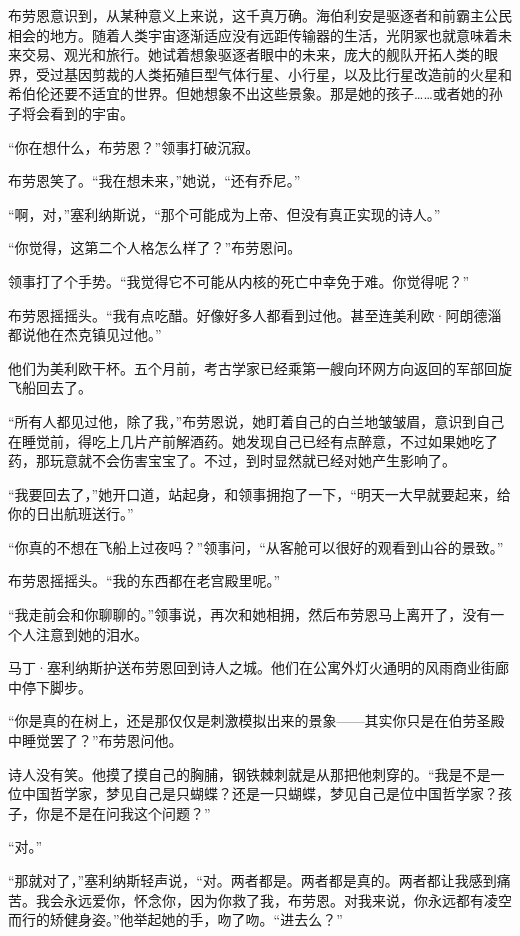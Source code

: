 \documentclass[AutoFakeBold=true]{book}
\begin{document}
布劳恩意识到，从某种意义上来说，这千真万确。海伯利安是驱逐者和前霸主公民相会的地方。随着人类宇宙逐渐适应没有远距传输器的生活，光阴冢也就意味着未来交易、观光和旅行。她试着想象驱逐者眼中的未来，庞大的舰队开拓人类的眼界，受过基因剪裁的人类拓殖巨型气体行星、小行星，以及比行星改造前的火星和希伯伦还要不适宜的世界。但她想象不出这些景象。那是她的孩子……或者她的孙子将会看到的宇宙。

``你在想什么，布劳恩？''领事打破沉寂。

布劳恩笑了。``我在想未来，''她说，``还有乔尼。''

``啊，对，''塞利纳斯说，``那个可能成为上帝、但没有真正实现的诗人。''

``你觉得，这第二个人格怎么样了？''布劳恩问。

领事打了个手势。``我觉得它不可能从内核的死亡中幸免于难。你觉得呢？''

布劳恩摇摇头。``我有点吃醋。好像好多人都看到过他。甚至连美利欧·阿朗德淄都说他在杰克镇见过他。''

他们为美利欧干杯。五个月前，考古学家已经乘第一艘向环网方向返回的军部回旋飞船回去了。

``所有人都见过他，除了我，''布劳恩说，她盯着自己的白兰地皱皱眉，意识到自己在睡觉前，得吃上几片产前解酒药。她发现自己已经有点醉意，不过如果她吃了药，那玩意就不会伤害宝宝了。不过，到时显然就已经对她产生影响了。

``我要回去了，''她开口道，站起身，和领事拥抱了一下，``明天一大早就要起来，给你的日出航班送行。''

``你真的不想在飞船上过夜吗？''领事问，``从客舱可以很好的观看到山谷的景致。''

布劳恩摇摇头。``我的东西都在老宫殿里呢。''

``我走前会和你聊聊的。''领事说，再次和她相拥，然后布劳恩马上离开了，没有一个人注意到她的泪水。

马丁·塞利纳斯护送布劳恩回到诗人之城。他们在公寓外灯火通明的风雨商业街廊中停下脚步。

``你是真的在树上，还是那仅仅是刺激模拟出来的景象——其实你只是在伯劳圣殿中睡觉罢了？''布劳恩问他。

诗人没有笑。他摸了摸自己的胸脯，钢铁棘刺就是从那把他刺穿的。``我是不是一位中国哲学家，梦见自己是只蝴蝶？还是一只蝴蝶，梦见自己是位中国哲学家？孩子，你是不是在问我这个问题？''

``对。''

``那就对了，''塞利纳斯轻声说，``对。两者都是。两者都是真的。两者都让我感到痛苦。我会永远爱你，怀念你，因为你救了我，布劳恩。对我来说，你永远都有凌空而行的矫健身姿。''他举起她的手，吻了吻。``进去么？''
\end{document}
